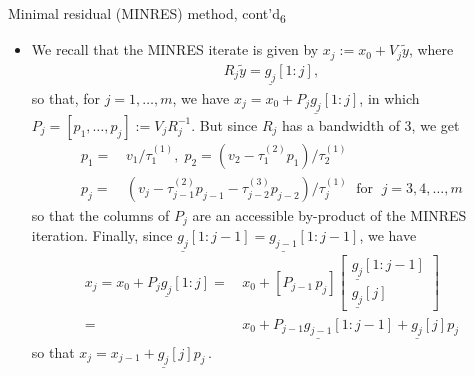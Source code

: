 \documentclass[t,usepdftitle=false]{beamer}
\begin{document}
\begin{frame}{Minimal residual (MINRES) method, cont'd\textsubscript{6}}
\begin{itemize}
\item We recall that the MINRES iterate is given by $x_j:=x_0+V_j\tilde{y}$, where 
\begin{align*}
R_j\tilde{y}=\underline{g_j}[1:j],
\end{align*}
so that, for $j=1,\dots,m$, we have $x_j=x_0+P_j\underline{g_j}[1:j]$, in which $P_j=[p_1,\dots,p_j]:=V_jR_j^{-1}$.
But since $R_j$ has a bandwidth of 3, we get
\begin{align*}
p_1=&\,v_1/\tau_1^{(1)},\;
p_2=(v_2-\tau_1^{(2)}p_1)/\tau_2^{(1)}\\
p_j=&\,(v_j-\tau_{j-1}^{(2)}p_{j-1}-\tau_{j-2}^{(3)}p_{j-2})/\tau_j^{(1)}
\;\text{ for }\;j=3,4,\dots,m
\end{align*}
so that the columns of $P_j$ are an accessible by-product of the MINRES iteration.
Finally, since $\underline{g_j}[1:j-1]=\underline{g_{j-1}}[1:j-1]$, we have
\begin{align*}
x_j=x_0+P_j\underline{g_j}[1:j]
=&\,x_0 + [P_{j-1}\,p_j]\begin{bmatrix}\underline{g_{j}}[1:j-1]\\\underline{g_j}[j]\end{bmatrix}\\
=&\,x_0+P_{j-1}\underline{g_{j-1}}[1:j-1]+\underline{g_j}[j]p_j
\end{align*}
so that $\boxed{x_j=x_{j-1}+\underline{g_j}[j]p_j}\,$.
\end{itemize}
\end{frame}
\end{document}
